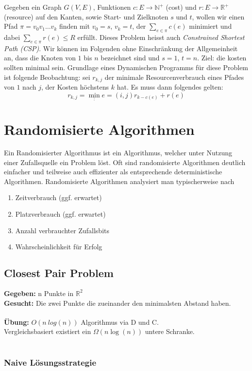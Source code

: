 \documentclass{article}
\begin{document}
Gegeben ein Graph $G(V,E)$, Funktionen  
$c:E\rightarrow \mathbb{N}^+$ (cost) und $r:E\rightarrow \mathbb{R}^+$ (resource) auf den Kanten, sowie Start-  und Zielknoten  $s$ und $t$, wollen wir einen Pfad $\pi=v_0v_1\dots v_k$ finden mit $v_0=s$, $v_k=t$, der  
$\displaystyle \sum_{e\in \pi} c(e)$ minimiert und dabei $\displaystyle \sum_{e\in \pi} r(e)\leq R$ erfüllt. Dieses Problem heisst auch \emph{Constrained Shortest Path (CSP)}.
Wir können im Folgenden ohne Einschränkung der Allgemeinheit  an, dass die Knoten von $1$ bis $n$ bezeichnet sind und $s=1$, $t=n$.
Ziel: die kosten sollten minimal sein. 
Grundlage eines Dynamischen  Programms für  diese Problem ist folgende Beobachtung: sei $r_{k,j}$ der minimale Resourcenverbrauch eines Pfades von $1$ nach $j$, der Kosten höchstens $k$ hat. Es muss dann folgendes gelten:
\[
	r_{k,j}=\min_:{e=(i,j)} r_{k-c(e)}+r(e)
\]
\section{Randomisierte Algorithmen}
Ein Randomisierter Algorithmus ist ein Algorithmus, welcher unter Nutzung einer Zufallsquelle ein Problem löst.
Oft sind randomisierte Algorithmen deutlich einfacher und teilweise auch effizienter als entsprechende deterministische Algorithmen.
Randomisierte Algorithmen analysiert man typischerweise nach 
\begin{enumerate}
    \item Zeitverbrauch (ggf. erwartet)
    \item Platzverbrauch (ggf. erwartet)
    \item Anzahl verbrauchter Zufallsbits
    \item Wahrscheinlichkeit für Erfolg 
\end{enumerate}

\subsection{Closest Pair Problem}

\textbf{Gegeben:} n Punkte in $\mathbb{R}^2$\\
\textbf{Gesucht:} Die zwei Punkte die zueinander den minimalsten Abstand haben.\\
\\
\textbf{Übung:} $O(n\ log(n))$ Algorithmus via D und C.\\
Vergleichsbasiert existiert ein $\Omega(n\log(n))$ untere Schranke.\\
\\
\subsubsection{Naive Lösungsstrategie}
\end{document}
